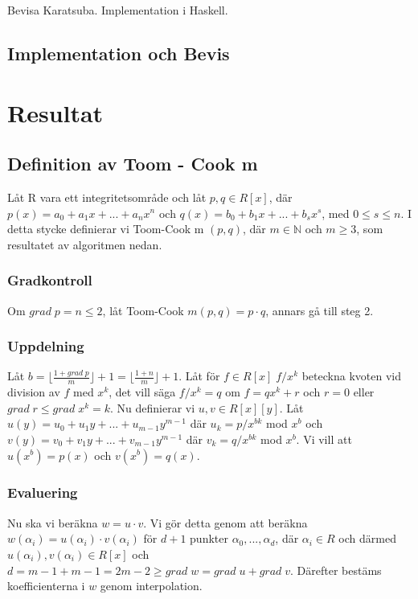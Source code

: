 \documentclass[a4paper]{article}
\begin{document}
Bevisa Karatsuba. Implementation i Haskell.

\subsection{Implementation och Bevis}

\section{Resultat}
\subsection{Definition av Toom - Cook m}
Låt R vara ett integritetsområde och låt $p, q \in R[x]$, där $p(x)= a_0 + a_1 x + ... + a_n x^n$ och
$q(x) = b_0 + b_1 x + ... + b_s x^s$, med $0 \leq s \leq n$. I detta stycke definierar vi Toom-Cook m $(p, q)$, där
$m \in \mathbb{N}$ och $m \geq 3$, som resultatet av algoritmen nedan.

\subsubsection{Gradkontroll}
Om $grad \; p = n \leq 2$, låt Toom-Cook $m (p, q) = p \cdot q$, annars gå till steg 2.

\subsubsection{Uppdelning}
Låt $b=\displaystyle \lfloor \frac{1 + grad \; p}{m}\rfloor + 1 = \lfloor \frac{1 + n}{m}\rfloor + 1$.
Låt för $f \in R[x] \; f / x^k$ beteckna kvoten vid division av $f$ med $x^k$, det vill säga $f/x^k = q$ om $f = q x^k + r$
och $r = 0$ eller $grad \;r \leq grad \; x^k = k$.
Nu definierar vi $u, v \in R[x][y]$. Låt $u(y)=u_0 + u_1 y + ... + u_{m-1} y^{m-1}$ där $u_k = p / x^{bk}$ mod $x^b$ och
 $v(y)=v_0 + v_1 y + ... + v_{m-1} y^{m-1}$ där $v_k = q / x^{bk}$ mod $x^b$. Vi vill att $u(x^b)=p(x)$ och $v(x^b)=q(x)$.

\subsubsection{Evaluering}
Nu ska vi beräkna $w = u \cdot v$. Vi gör detta genom att beräkna $w(\alpha_i)=u(\alpha_i) \cdot v(\alpha_i)$
för $d + 1$ punkter $\alpha_0, ...,  \alpha_d$, där $\alpha_i \in R$ och därmed $u(\alpha_i), v(\alpha_i) \in R[x]$
och $d = m - 1 + m -1 = 2m-2 \geq grad \; w = grad \; u + grad \; v$. Därefter bestäms koefficienterna i $w$ genom interpolation.
\end{document}

